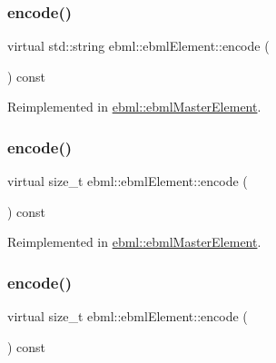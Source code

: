 \subsubsection{\texorpdfstring{encode()}{encode()}\hspace{0.1cm}{\footnotesize\ttfamily [1/5]}}
{\footnotesize\ttfamily virtual std\+::string ebml\+::ebml\+Element\+::encode (\begin{DoxyParamCaption}{ }\end{DoxyParamCaption}) const\hspace{0.3cm}{\ttfamily [virtual]}}



Reimplemented in \mbox{\hyperlink{classebml_1_1ebmlMasterElement_a2016b30a9ac7d48e990a6a864138a362}{ebml\+::ebml\+Master\+Element}}.

\mbox{\label{classebml_1_1ebmlElement_a5aeddfac34c2c839873146be6c634aed}} 
\subsubsection{\texorpdfstring{encode()}{encode()}\hspace{0.1cm}{\footnotesize\ttfamily [2/5]}}
{\footnotesize\ttfamily virtual size\+\_\+t ebml\+::ebml\+Element\+::encode (\begin{DoxyParamCaption}\item[{char $\ast$}]{ }\end{DoxyParamCaption}) const\hspace{0.3cm}{\ttfamily [virtual]}}



Reimplemented in \mbox{\hyperlink{classebml_1_1ebmlMasterElement_ac0bc9d595746939fea3e30b810d89c9f}{ebml\+::ebml\+Master\+Element}}.

\mbox{\label{classebml_1_1ebmlElement_ad493e4103807b8d4434c0667c148dcea}} 
\subsubsection{\texorpdfstring{encode()}{encode()}\hspace{0.1cm}{\footnotesize\ttfamily [3/5]}}
{\footnotesize\ttfamily virtual size\+\_\+t ebml\+::ebml\+Element\+::encode (\begin{DoxyParamCaption}\item[{\mbox{\hyperlink{classebml_1_1ioBase}{io\+Base}} $\ast$}]{ }\end{DoxyParamCaption}) const\hspace{0.3cm}{\ttfamily [virtual]}}



